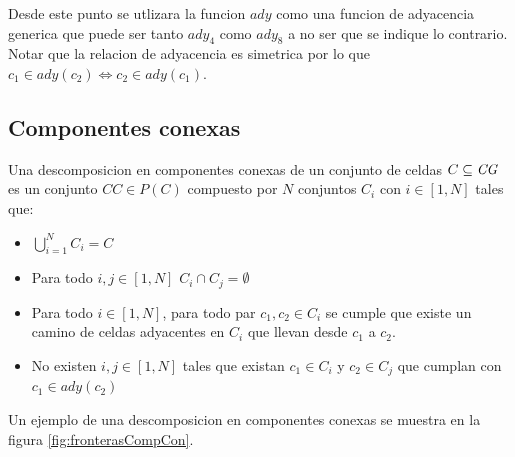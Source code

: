 Desde este punto se utlizara la funcion $ady$ como una funcion de adyacencia
generica que puede ser tanto $ady_4$ como $ady_8$ a no ser que se indique lo
contrario.
Notar que la relacion de adyacencia es simetrica por lo que $c_1 \in ady(c_2)
\Leftrightarrow c_2 \in ady(c_1)$.

\subsection{Componentes conexas} \label{subsec:CompComp}
Una descomposicion en componentes conexas de un conjunto de
celdas $C \subseteq \mathit{CG}$ es un conjunto $CC\in P(C)$ compuesto por $N$ conjuntos $C_i$ con
$i\in[1,N]$ tales que:
\begin{itemize}
  \item $\bigcup_{i=1}^{N}C_i = C$ 
  \item Para todo $i,j \in [1,N]$ $C_i\cap C_j = \emptyset$
  \item Para todo $i \in [1,N]$, para todo par $c_1,c_2 \in C_i$ se cumple que existe un camino de celdas adyacentes en $C_i$ que llevan desde $c_1$ a $c_2$.
  \item No existen $i,j \in [1,N]$ tales que existan $c_1 \in C_i$ y $c_2 \in C_j$ que cumplan con $c_1 \in ady(c_2)$ 
\end{itemize}

Un ejemplo de una descomposicion en componentes conexas se muestra en la figura \ref{fig:fronterasCompCon}.

